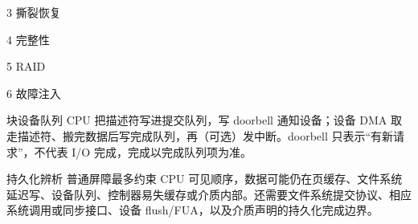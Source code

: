 \begin{chapteranswer}{3}
撕裂恢复
\end{chapteranswer}

\begin{chapteranswer}{4}
完整性
\end{chapteranswer}

\begin{chapteranswer}{5}
RAID
\end{chapteranswer}

\begin{chapteranswer}{6}
故障注入
\end{chapteranswer}

\begin{chapteranswer}{块设备队列}
CPU 把描述符写进提交队列，写 doorbell 通知设备；设备 DMA 取走描述符、搬完数据后写完成队列，再（可选）发中断。doorbell 只表示“有新请求”，不代表 I/O 完成，完成以完成队列项为准。
\end{chapteranswer}

\begin{chapteranswer}{持久化辨析}
普通屏障最多约束 CPU 可见顺序，数据可能仍在页缓存、文件系统延迟写、设备队列、控制器易失缓存或介质内部。还需要文件系统提交协议、相应系统调用或同步接口、设备 flush/FUA，以及介质声明的持久化完成边界。
\end{chapteranswer}
